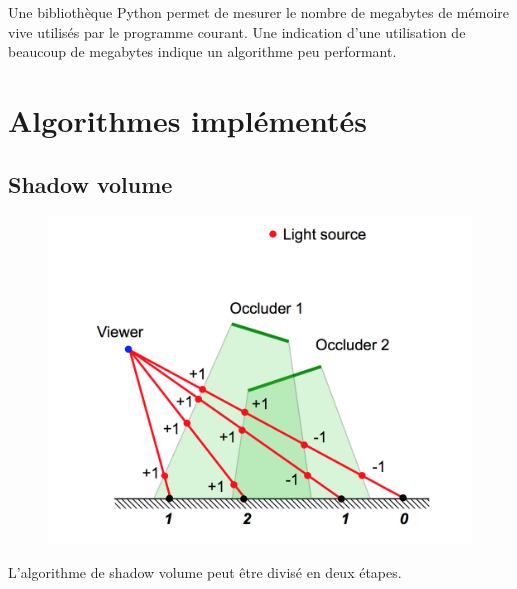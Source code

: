 \documentclass[a4paper,12pt]{report}
\begin{document}
Une bibliothèque Python permet de mesurer le nombre de megabytes de mémoire vive utilisés par le programme courant. Une indication d'une utilisation de beaucoup de megabytes indique un algorithme peu performant.



\section{Algorithmes implémentés} 

\subsection{Shadow volume}

\begin{figure}[H]

\includegraphics[scale=0.32]{images/shadow_volume.png}
\centering
{}
\end{figure}
L'algorithme de shadow volume peut être divisé en deux étapes.
\end{document}
